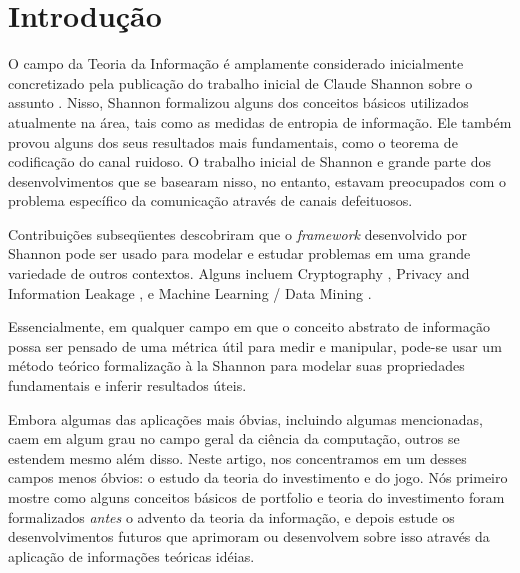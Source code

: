 \section{Introdução}
O campo da Teoria da Informação é amplamente considerado inicialmente concretizado pela publicação do trabalho inicial de Claude Shannon sobre o assunto \cite{shannon1}. Nisso, Shannon formalizou alguns dos conceitos
básicos utilizados atualmente na área, tais como as medidas de entropia de informação. Ele também provou alguns dos seus resultados mais fundamentais, como o teorema de codificação do canal ruidoso. O trabalho inicial de Shannon e grande parte dos desenvolvimentos que se basearam nisso, no entanto, estavam preocupados com o problema específico da comunicação através de canais defeituosos.

Contribuições subseqüentes descobriram que o \textit{framework} desenvolvido por Shannon pode ser usado para modelar e estudar problemas em uma grande variedade de outros contextos. Alguns incluem Cryptography \cite{ahlswede1}, Privacy and Information Leakage \cite{alvim1}, e Machine Learning / Data Mining \cite{witten1}.

Essencialmente, em qualquer campo em que o conceito abstrato de informação possa ser pensado de uma métrica útil para medir e manipular, pode-se usar um método teórico formalização à la Shannon para modelar suas propriedades fundamentais e inferir resultados úteis.

Embora algumas das aplicações mais óbvias, incluindo algumas mencionadas, caem em algum grau no campo geral da ciência da computação, outros se estendem mesmo além disso. Neste artigo, nos concentramos em um desses campos menos óbvios: o estudo da teoria do investimento e do jogo. Nós primeiro mostre como alguns conceitos básicos de portfolio e teoria do investimento foram formalizados \emph{antes} o advento da teoria da informação, e depois estude os desenvolvimentos futuros que aprimoram ou desenvolvem sobre isso através da aplicação de informações teóricas idéias.